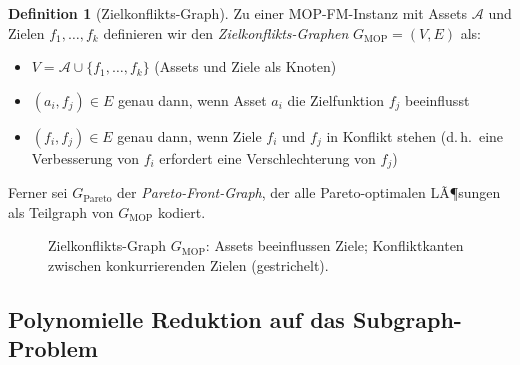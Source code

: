 ﻿\documentclass[a4paper,12pt]{article}
\theoremstyle{definition}
\newtheorem{definition}{Definition}[section]
\begin{document}
\begin{definition}[Zielkonflikts-Graph]
\label{def:zkg}
Zu einer MOP-FM-Instanz mit Assets $\mathcal{A}$ und Zielen $f_1, \ldots, f_k$
definieren wir den \emph{Zielkonflikts-Graphen} $G_{\mathrm{MOP}} = (V, E)$ als:
\begin{itemize}
    \item $V = \mathcal{A} \cup \{f_1, \ldots, f_k\}$ (Assets und Ziele als Knoten)
    \item $(a_i, f_j) \in E$ genau dann, wenn Asset $a_i$ die Zielfunktion $f_j$
          beeinflusst
    \item $(f_i, f_j) \in E$ genau dann, wenn Ziele $f_i$ und $f_j$ in Konflikt stehen
          (d.\,h.\ eine Verbesserung von $f_i$ erfordert eine Verschlechterung von $f_j$)
\end{itemize}
Ferner sei $G_{\mathrm{Pareto}}$ der \emph{Pareto-Front-Graph}, der alle Pareto-optimalen
LÃ¶sungen als Teilgraph von $G_{\mathrm{MOP}}$ kodiert.
\end{definition}

\begin{figure}[h]
\centering
{}
\caption{Zielkonflikts-Graph $G_{\mathrm{MOP}}$: Assets beeinflussen Ziele;
         Konfliktkanten zwischen konkurrierenden Zielen (gestrichelt).}
\label{fig:mop-graph}
\end{figure}

\subsection{Polynomielle Reduktion auf das Subgraph-Problem}
\end{document}
